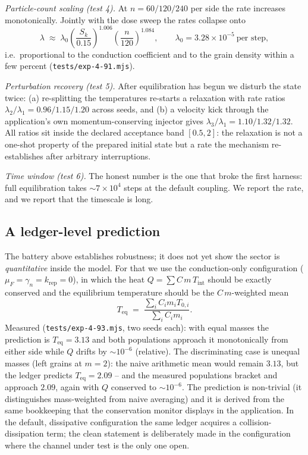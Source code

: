 \documentclass[aps,reprint,amsmath,amssymb,nofootinbib,superscriptaddress,floatfix]{revtex4-2}
\begin{document}
\emph{Particle-count scaling (test 4).} At $n=60/120/240$ per side the
rate increases monotonically. Jointly with the dose sweep the rates
collapse onto
\begin{equation}
\lambda \;\approx\; \lambda_0
\left(\frac{S_k}{0.15}\right)^{1.006}
\left(\frac{n}{120}\right)^{1.084},
\qquad \lambda_0 = 3.28\times10^{-5}\ \text{per step},
\label{eq:microfit}
\end{equation}
i.e.\ proportional to the conduction coefficient and to the grain
density within a few percent (\texttt{tests/exp-4-91.mjs}).

\emph{Perturbation recovery (test 5).} After equilibration has begun we
disturb the state twice: (a) re-splitting the temperatures re-starts a
relaxation with rate ratios $\lambda_2/\lambda_1 = 0.96/1.15/1.20$
across seeds, and (b) a velocity kick through the application's own
momentum-conserving injector gives $\lambda_3/\lambda_1 =
1.10/1.32/1.32$. All ratios sit inside the declared acceptance band
$[0.5, 2]$: the relaxation is not a one-shot property of the prepared
initial state but a rate the mechanism re-establishes after arbitrary
interruptions.

\emph{Time window (test 6).} The honest number is the one that broke
the first harness: full equilibration takes ${\sim}7\times10^{4}$ steps
at the default coupling. We report the rate, and we report that the
timescale is long.

\subsection{A ledger-level prediction}

The battery above establishes robustness; it does not yet show the
sector is \emph{quantitative} inside the model. For that we use the
conduction-only configuration ($\mu_F=\gamma_n=k_{\mathrm{rep}}=0$),
in which the heat $Q=\sum C\,m\,T_{\mathrm{int}}$ should be exactly
conserved and the equilibrium temperature should be the
$C\,m$-weighted mean
\begin{equation}
T_{\mathrm{eq}} \;=\; \frac{\sum_i C_i m_i T_{0,i}}{\sum_i C_i m_i}.
\label{eq:teq}
\end{equation}
Measured (\texttt{tests/exp-4-93.mjs}, two seeds each): with equal
masses the prediction is $T_{\mathrm{eq}}=3.13$ and both populations
approach it monotonically from either side while $Q$ drifts by
${\sim}10^{-6}$ (relative). The discriminating case is unequal masses
(left grains at $m=2$): the naive arithmetic mean would remain $3.13$,
but the ledger predicts $T_{\mathrm{eq}}=2.09$ -- and the measured
populations bracket and approach $2.09$, again with $Q$ conserved to
${\sim}10^{-6}$. The prediction is non-trivial (it distinguishes
mass-weighted from naive averaging) and it is derived from the same
bookkeeping that the conservation monitor displays in the application.
In the default, dissipative configuration the same ledger acquires a
collision-dissipation term; the clean statement is deliberately made in
the configuration where the channel under test is the only one open.
\end{document}
